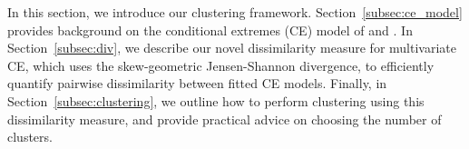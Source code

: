 \documentclass[12pt]{article}
\newcommand{\JSGa}{\mathop{\mathrm{JS}^{\mathrm{G}_{\lambda}}}\nolimits}
\begin{document}
In this section, we introduce our clustering framework. %
Section~\ref{subsec:ce_model} provides background on the conditional extremes (CE) model of \citet{Heffernan2004} and \citet{Keef2013}. %
In Section~\ref{subsec:div}, we describe our novel dissimilarity measure for multivariate CE, which uses the skew-geometric Jensen-Shannon divergence, to efficiently quantify pairwise dissimilarity between fitted CE models.
Finally, in Section~\ref{subsec:clustering}, we outline how to perform clustering using this dissimilarity measure, and provide practical advice on choosing the number of clusters.
\end{document}
